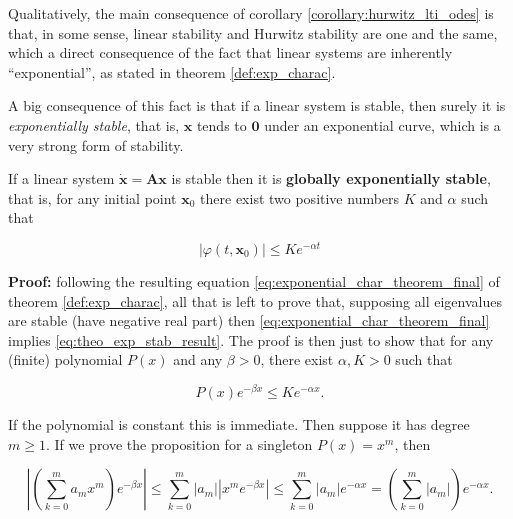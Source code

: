 	Qualitatively, the main consequence of corollary \ref{corollary:hurwitz_lti_odes} is that, in some sense, linear stability and Hurwitz stability are one and the same, which a direct consequence of the fact that linear systems are inherently ``exponential'', as stated in theorem \ref{def:exp_charac}.

	A big consequence of this fact is that if a linear system is stable, then surely it is \textit{exponentially stable}, that is, $\mathbf{x}$ tends to $\mathbf{0}$ under an exponential curve, which is a very strong form of stability.

\begin{corollary} \label{corollary:exp_stability} %
	If a linear system $\dot{\mathbf{x}} = \mathbf{Ax}$ is stable then it is \textbf{globally exponentially stable}, that is, for any initial point $\mathbf{x}_0$ there exist two positive numbers $K$ and $\alpha$ such that

\begin{equation} \left\lvert \varphi\left(t,\mathbf{x}_0\right)\right\rvert \leq Ke^{-\alpha t} \label{eq:theo_exp_stab_result}\end{equation}
\end{corollary}
\noindent\textbf{Proof:} following the resulting equation \eqref{eq:exponential_char_theorem_final} of theorem \ref{def:exp_charac}, all that is left to prove that, supposing all eigenvalues are stable (have negative real part) then \eqref{eq:exponential_char_theorem_final} implies \eqref{eq:theo_exp_stab_result}. The proof is then just to show that for any (finite) polynomial $P(x)$ and any $\beta > 0$, there exist $\alpha,K > 0$ such that

\begin{equation} P(x)e^{-\beta x} \leq Ke^{-\alpha x}. \end{equation}

	If the polynomial is constant this is immediate. Then suppose it has degree $m \geq 1$. If we prove the proposition for a singleton $P(x) = x^m$, then

\begin{equation} \left\lvert \left(\sum_{k=0}^m a_mx^m\right)e^{-\beta x}\right\rvert \leq \sum_{k=0}^m \left\lvert a_m \right\rvert\left\lvert x^me^{-\beta x} \right\rvert \leq \sum_{k=0}^m \left\lvert a_m \right\rvert e^{-\alpha x} = \left(\sum_{k=0}^m \left\lvert a_m \right\rvert\right) e^{-\alpha x}. \end{equation}

